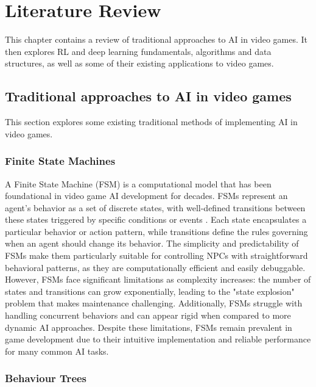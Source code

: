 \chapter{Literature Review}

This chapter contains a review of traditional approaches to AI in video games.
It then explores RL and deep learning fundamentals, algorithms and data structures, as well as some of their existing applications to video games.

\section{Traditional approaches to AI in video games}

This section explores some existing traditional methods of implementing AI in video games.

\subsection{Finite State Machines}

A Finite State Machine (FSM) is a computational model that has been foundational in video game AI development for decades. 
FSMs represent an agent's behavior as a set of discrete states, with well-defined transitions between these states triggered by specific conditions or events \cite{spiceworks_fsm}. 
Each state encapsulates a particular behavior or action pattern, while transitions define the rules governing when an agent should change its behavior. 
The simplicity and predictability of FSMs make them particularly suitable for controlling NPCs with straightforward behavioral patterns, as they are computationally efficient and easily debuggable.
However, FSMs face significant limitations as complexity increases: the number of states and transitions can grow exponentially, leading to the "state explosion" problem that makes maintenance challenging.
Additionally, FSMs struggle with handling concurrent behaviors and can appear rigid when compared to more dynamic AI approaches. 
Despite these limitations, FSMs remain prevalent in game development due to their intuitive implementation and reliable performance for many common AI tasks.

\subsection{Behaviour Trees}

